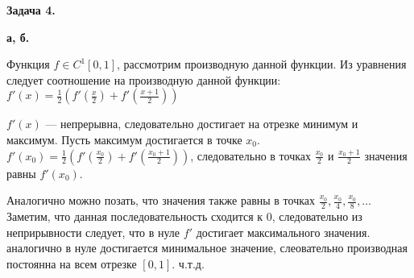 {\bf Задача 4.}

{\bf а, б.}

Функция $f \in C^{1}[0, 1]$, рассмотрим производную данной функции.
Из уравнения следует соотношение на производную данной функции: \\
$f'(x) = \frac{1}{2} (f'(\frac{x}{2}) + f'(\frac{x + 1}{2}))$

$f'(x)$ --- непрерывна, следовательно достигает на отрезке минимум и максимум. Пусть
максимум достигается в точке $x_0$.
$f'(x_0) = \frac{1}{2} (f'(\frac{x_0}{2}) + f'(\frac{x_0 + 1}{2}))$, следовательно в точках
$\frac{x_0}{2}$ и $\frac{x_0 + 1}{2}$ значения равны $f'(x_0)$.

Аналогично можно позать, что значения также равны в точках $\frac{x_0}{2}, \frac{x_0}{4}, \frac{x_0}{8}, \ldots$
Заметим, что данная последовательность сходится к $0$, следовательно из неприрывности следует, что в нуле $f'$
достигает максимального значения. аналогично в нуле достигается минимальное значение, слеовательно производная постоянна
на всем отрезке $[0, 1]$. ч.т.д.
